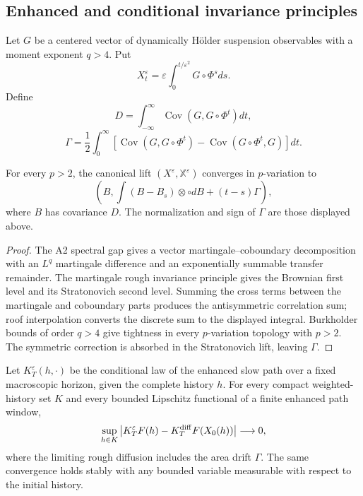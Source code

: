 \subsection{Enhanced and conditional invariance principles}

Let \(G\) be a centered vector of dynamically Hölder suspension observables
with a moment exponent \(q>4\).  Put
\[
X_t^\varepsilon=\varepsilon
\int_0^{t/\varepsilon^2}G\circ\Phi^sds.
\]
Define
\[
D=\int_{-\infty}^{\infty}
\operatorname{Cov}(G,G\circ\Phi^t)dt,
\]
\[
\Gamma=\frac12\int_0^\infty
\left[
\operatorname{Cov}(G,G\circ\Phi^t)
-\operatorname{Cov}(G\circ\Phi^t,G)
\right]dt.
\]

\begin{theorem}
\label{thm:r6-a4-rough}
For every \(p>2\), the canonical lift
\((X^\varepsilon,\mathbb X^\varepsilon)\) converges in
\(p\)-variation to
\[
\left(B,
\int(B-B_s)\otimes\circ dB+(t-s)\Gamma
\right),
\]
where \(B\) has covariance \(D\).  The normalization and sign of
\(\Gamma\) are those displayed above.
\end{theorem}

\begin{proof}
The A2 spectral gap gives a vector martingale--coboundary decomposition with
an \(L^q\) martingale difference and an exponentially summable transfer
remainder.  The martingale rough invariance principle gives the Brownian first
level and its Stratonovich second level.  Summing the cross terms between the
martingale and coboundary parts produces the antisymmetric correlation sum;
roof interpolation converts the discrete sum to the displayed integral.
Burkholder bounds of order \(q>4\) give tightness in every
\(p\)-variation topology with \(p>2\).  The symmetric correction is absorbed
in the Stratonovich lift, leaving \(\Gamma\).
\end{proof}

\begin{theorem}
\label{thm:r6-a4-conditional}
Let \(K_T^\varepsilon(h,\cdot)\) be the conditional law of the enhanced slow
path over a fixed macroscopic horizon, given the complete history \(h\).
For every compact weighted-history set \(K\) and every bounded Lipschitz
functional of a finite enhanced path window,
\[
\sup_{h\in K}
\left|K_T^\varepsilon F(h)-K_T^{\rm diff}F(X_0(h))\right|
\longrightarrow0,
\]
where the limiting rough diffusion includes the area drift \(\Gamma\).  The
same convergence holds stably with any bounded variable measurable with
respect to the initial history.
\end{theorem}

